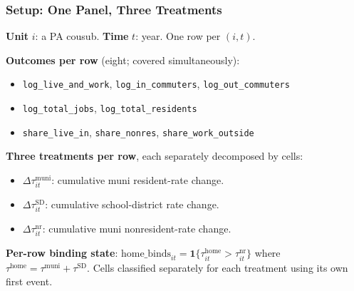 \documentclass[xcolor = x11names, compress, aspectratio = 169]{beamer}
\begin{document}
    \begin{frame}
    \frametitle{Setup: One Panel, Three Treatments}
        \footnotesize
        \textbf{Unit} $i$: a PA cousub. \textbf{Time} $t$: year.
        One row per $(i,t)$.
        \medskip

        \textbf{Outcomes per row} (eight; covered simultaneously):
        \begin{itemize}\setlength{\itemsep}{0.02cm}\scriptsize
            \item \texttt{log\_live\_and\_work}, \texttt{log\_in\_commuters},
            \texttt{log\_out\_commuters}
            \item \texttt{log\_total\_jobs}, \texttt{log\_total\_residents}
            \item \texttt{share\_live\_in}, \texttt{share\_nonres},
            \texttt{share\_work\_outside}
        \end{itemize}
        \medskip

        \textbf{Three treatments per row}, each separately decomposed by cells:
        \begin{itemize}\setlength{\itemsep}{0.02cm}\scriptsize
            \item $\Delta\tau^{\text{muni}}_{it}$: cumulative muni resident-rate change.
            \item $\Delta\tau^{\text{SD}}_{it}$: cumulative school-district rate change.
            \item $\Delta\tau^{\text{nr}}_{it}$: cumulative muni nonresident-rate change.
        \end{itemize}
        \medskip

        \textbf{Per-row binding state}:
        $\text{home\_binds}_{it} = \mathbf{1}\{\tau^{\text{home}}_{it} > \tau^{\text{nr}}_{it}\}$
        where $\tau^{\text{home}} = \tau^{\text{muni}} + \tau^{\text{SD}}$.
        Cells classified separately for each treatment using its own first event.
    \end{frame}
\end{document}
